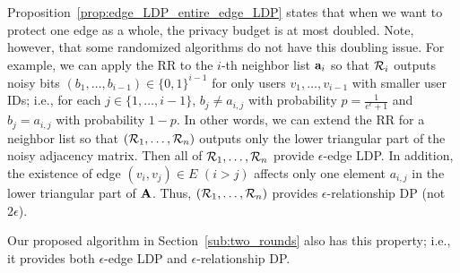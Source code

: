 Proposition~\ref{prop:edge_LDP_entire_edge_LDP} states that when we want to protect one edge as a whole, the privacy budget is at most doubled. 
Note, however, that 
some randomized algorithms do not have this doubling issue. 
For example, we can apply the RR to the $i$-th neighbor list $\mathbf{a}_i$ so that $\mathcal{R}_i$ outputs noisy bits 
$(b_1, \ldots, b_{i-1}) \in \{0,1\}^{i-1}$ 
for only users 
$v_1, \ldots, v_{i-1}$ with smaller user IDs; 
i.e., 
for each 
$j \in \{1, \ldots, i-1\}$, 
$b_j \neq a_{i,j}$ with probability $p = \frac{1}{e^\epsilon + 1}$ and $b_j = a_{i,j}$ with probability $1-p$. 
In other words, we can extend 
the RR for a neighbor list 
so that $(\mathcal{R}_1, \ldots, \mathcal{R}_n)$ outputs only 
the lower triangular part 
of the noisy adjacency matrix. 
Then all of $\mathcal{R}_1, \ldots, \mathcal{R}_n$ provide $\epsilon$-edge LDP. 
In addition, the existence of edge $(v_i, v_j) \in E$ 
$(i > j)$ 
affects only one element $a_{i,j}$ in 
the lower triangular part 
of $\mathbf{A}$. 
Thus, $(\mathcal{R}_1, \ldots, \mathcal{R}_n)$ provides $\epsilon$-relationship DP (not $2\epsilon$). 

Our proposed algorithm in Section~\ref{sub:two_rounds} also has this property; i.e., 
it provides both $\epsilon$-edge LDP and $\epsilon$-relationship DP. 


